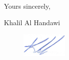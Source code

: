 \documentclass[12pt]{article} %
\begin{document}
Yours sincerely,

\medskip %

Khalil Al Handawi

\begin{figure}[h]
	\includegraphics[width=0.2\textwidth]{Signiture.png}
\end{figure}

\medskip %

\end{document}
